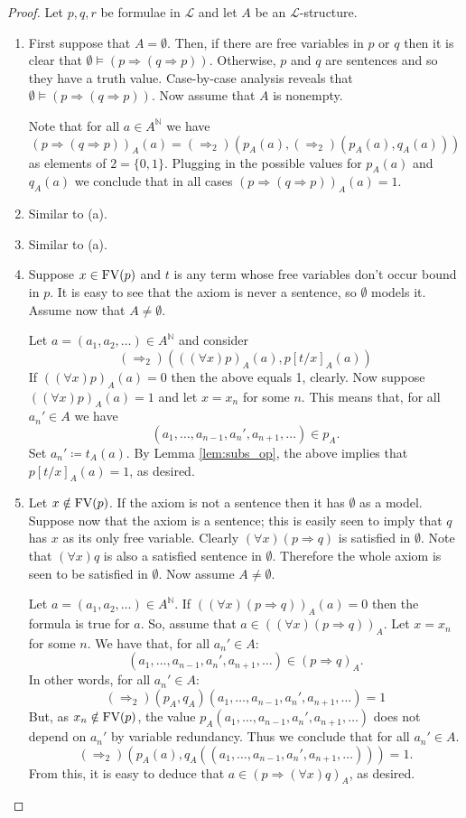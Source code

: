 \documentclass{report}
\theoremstyle{definition}
\theoremstyle{plain}
\theoremstyle{definition}
\begin{document}
	\begin{proof}
		Let $p,q,r$ be formulae in $\mathcal{L}$ and let $A$ be an $\mathcal{L}$-structure.
		\begin{enumerate}
			\item First suppose that $A=\emptyset$. Then, if there are free variables in $p$ or $q$ then it is clear that $\emptyset\models (p\Rightarrow (q\Rightarrow p))$. Otherwise, $p$ and $q$ are sentences and so they have a truth value. Case-by-case analysis reveals that $\emptyset\models (p\Rightarrow (q\Rightarrow p))$. Now assume that $A$ is nonempty.
			
			Note that for all $a\in A^{\mathbb{N}}$ we have
			\[
			(p\Rightarrow (q\Rightarrow p))_A(a) = (\Rightarrow_2) (p_A(a), (\Rightarrow_2)(p_A(a),q_A(a)))
			\]
			as elements of $2 = \{0,1\}$. Plugging in the possible values for $p_A(a)$ and $q_A(a)$ we conclude that in all cases $(p\Rightarrow (q\Rightarrow p))_A(a) = 1$.
			\item Similar to (a).
			\item Similar to (a).
			\item Suppose $x\in \textnormal{FV}(p)$ and $t$ is any term whose free variables don't occur bound in $p$. It is easy to see that the axiom is never a sentence, so $\emptyset$ models it. Assume now that $A\neq \emptyset$.
			
			Let $a =(a_1,a_2,\ldots)\in A^{\mathbb{N}}$ and consider 
			\[
			(\Rightarrow_2)(((\forall x)p)_A(a), p[t/x]_A(a))
			\]
			If $((\forall x)p)_A(a) = 0$ then the above equals 1, clearly. Now suppose $((\forall x)p)_A(a) = 1$ and let $x = x_n$ for some $n$. This means that, for all $a_n'\in A$ we have
			\[
			(a_1,\ldots, a_{n-1},a_n',a_{n+1},\ldots)\in p_A.
			\]
			Set $a_n' \coloneqq t_A(a)$. By Lemma \ref{lem:subs_op}, the above implies that $p[t/x]_A(a) = 1$, as desired.
			\item Let $x\notin \textnormal{FV}(p)$. If the axiom is not a sentence then it has $\emptyset$ as a model. Suppose now that the axiom is a sentence; this is easily seen to imply that $q$ has $x$ as its only free variable. Clearly $(\forall x)(p\Rightarrow q)$ is satisfied in $\emptyset$. Note that $(\forall x) q$ is also a satisfied sentence in $\emptyset$. Therefore the whole axiom is seen to be satisfied in $\emptyset$. Now assume $A\neq \emptyset$.
			
			Let $a =(a_1,a_2,\ldots)\in A^{\mathbb{N}}$. If $((\forall x) (p \Rightarrow q))_A(a) = 0$ then the formula is true for $a$. So, assume that $a\in ((\forall x) (p \Rightarrow q))_A$. Let $x = x_n$ for some $n$. We have that, for all $a_n'\in A$:
			\[
			(a_1,\ldots, a_{n-1},a_n',a_{n+1},\ldots) \in (p\Rightarrow q)_A.
			\]
			In other words, for all $a_n'\in A$:
			\[
			(\Rightarrow_2)(p_A,q_A)(a_1,\ldots, a_{n-1},a_n',a_{n+1},\ldots) = 1
			\]
			But, as $x_n\notin \textnormal{FV}(p)$, the value $p_A(a_1,\ldots, a_{n-1},a_n',a_{n+1},\ldots)$ does not depend on $a_n'$ by variable redundancy. Thus we conclude that for all $a_n'\in A$.
			\[
			(\Rightarrow_2)(p_A(a),q_A((a_1,\ldots, a_{n-1},a_n',a_{n+1},\ldots))) = 1.
			\]
			From this, it is easy to deduce that $a\in (p \Rightarrow (\forall x)q)_A$, as desired.
			

\end{enumerate}
\end{proof}
\end{document}
